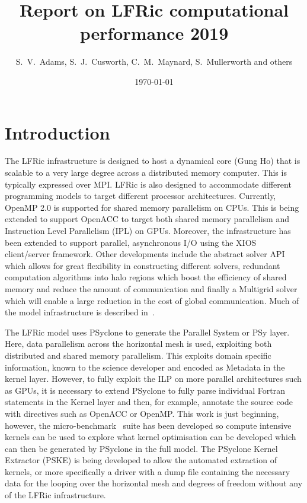 \documentclass[11pt]{article}
\author{S.~V.~Adams, S.~J.~Cusworth, C.~M.~Maynard, S.~Mullerworth and others}
\title{Report on LFRic computational performance 2019}
\date{\today}
\begin{document}
\maketitle
\medskip
\section{Introduction\label{sec:intro}}
The LFRic infrastructure is designed to host a dynamical core (Gung Ho)
that is scalable to a very large degree across a distributed memory
computer. This is typically expressed over MPI. LFRic is also designed
to accommodate different programming models to target different
processor architectures. Currently, OpenMP 2.0 is supported for shared
memory parallelism on CPUs. This is being extended to support OpenACC
to target both shared memory parallelism and Instruction Level
Parallelism (IPL) on GPUs. Moreover, the infrastructure has been
extended to support parallel, asynchronous I/O using the XIOS
client/server framework.
Other developments include the abstract solver API which allows for great
flexibility in constructing different solvers, redundant computation
algorithms into halo regions which boost the efficiency of shared
memory and reduce the amount of communication and finally a Multigrid
solver which will enable a large reduction in the cost of global communication.
Much of the model infrastructure is described in~\cite{LFRic}.

The LFRic model uses PSyclone to generate the Parallel System or PSy
layer. Here, data parallelism across the horizontal mesh is used,
exploiting both distributed and shared memory parallelism. This
exploits domain specific information, known to the science developer
and encoded as Metadata in the kernel layer. However, to
fully exploit the ILP on more parallel architectures such as GPUs, it
is necessary to extend PSyclone to fully parse individual Fortran
statements in the Kernel layer and then, for example, annotate the
source code with directives such as OpenACC or OpenMP. This work is just beginning,
however, the micro-benchmark~\cite{lfric-microbenchmarks} suite has been
developed so compute intensive kernels can be used to explore what kernel
optimisation can be developed which can then be generated by PSyclone in the full
model. The PSyclone Kernel Extractor (PSKE) is being developed to
allow the automated extraction of kernels, or more specifically a
driver with a dump file containing the necessary data for the looping
over the horizontal mesh and degrees of freedom without any of the
LFRic infrastructure.
\end{document}
